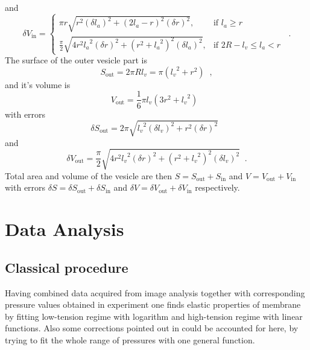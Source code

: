 and
\begin{equation*}
\delta V_{\text{in}} = \left\{
\begin{array}{ll}
	\pi r \sqrt{r^2\left(\delta l_a\right)^2 + \left(2l_a-r\right)^2 \left(\delta r\right)^2}, & \text{if } l_a \geq r\\
	\frac{\pi}{2} \sqrt{4 r^2 {l_a}^2\left(\delta r\right)^2 + \left(r^2+{l_a}^2\right)^2 \left(\delta l_a\right)^2}, & \text{if } 2R-l_v \leq l_a < r
\end{array}
\right.\;\;.
\end{equation*}
The surface of the outer vesicle part is
\begin{equation*}
S_\text{out} = 2\pi Rl_v = \pi \left({l_v}^2+r^2\right)\;\;,
\end{equation*}
and it's volume is
\begin{equation*}
V_\text{out} = \frac{1}{6}\pi l_v\left(3r^2+{l_v}^2\right)\;\;
\end{equation*}
with errors
\begin{equation*}
\delta S_\text{out} = 2\pi\sqrt{{l_v}^2 \left(\delta l_v\right)^2 + r^2 \left( \delta r\right) ^2}\;\;
\end{equation*}
and
\begin{equation*}
\delta V_\text{out} = \frac{\pi}{2} \sqrt{4 r^2 {l_v}^2\left(\delta r\right)^2 + \left(r^2+{l_v}^2\right)^2 \left(\delta l_v\right)^2}\;\;.
\end{equation*}
Total area and volume of the vesicle are then $S = S_\text{out}+S_\text{in}$ and $V = V_\text{out}+V_\text{in}$ with errors $\delta S = \delta S_\text{out} + \delta S_\text{in}$ and $\delta V = \delta V_\text{out} + \delta V_\text{in}$ respectively.

\section{Data Analysis}\label{analysis}
\subsection{Classical procedure}
Having combined data acquired from image analysis together with corresponding pressure values obtained in experiment one finds elastic properties of membrane by fitting low-tension regime with logarithm and high-tension regime with linear functions. Also some corrections pointed out in \cite{Henriksen2004, Fournier2001} could be accounted for here, by trying to fit the whole range of pressures with one general function.

